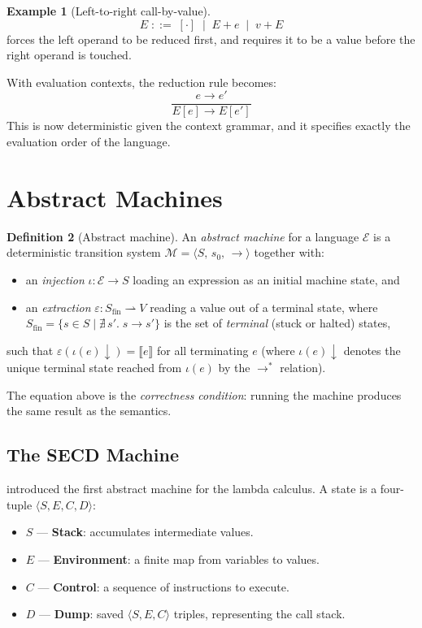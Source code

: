 \documentclass[11pt, a4paper]{article}
\theoremstyle{definition}
\newtheorem{definition}{Definition}[section]
\newtheorem{example}[definition]{Example}
\theoremstyle{plain}
\theoremstyle{remark}
\begin{document}
\begin{example}[Left-to-right call-by-value]
  \[
    E \;::=\; [\cdot] \;\mid\; E + e \;\mid\; v + E
  \]
  forces the left operand to be reduced first, and requires it to be a value
  before the right operand is touched.
\end{example}

With evaluation contexts, the reduction rule becomes:
\[
  \frac{e \to e'}{E[e] \to E[e']}
\]
This is now deterministic given the context grammar, and it specifies exactly
the evaluation order of the language.


\section{Abstract Machines}

\begin{definition}[Abstract machine]
  An \emph{abstract machine} for a language $\mathcal{E}$ is a deterministic
  transition system $\mathcal{M} = \langle S,\, s_0,\, \to\rangle$ together with:
  \begin{itemize}
    \item an \emph{injection} $\iota : \mathcal{E} \to S$ loading an
          expression as an initial machine state, and
    \item an \emph{extraction} $\varepsilon : S_{\mathrm{fin}} \rightharpoonup V$
          reading a value out of a terminal state, where
          $S_{\mathrm{fin}} = \{s \in S \mid \nexists\, s'.\; s \to s'\}$
          is the set of \emph{terminal} (stuck or halted) states,
  \end{itemize}
  such that $\varepsilon(\iota(e){\downarrow}) = \llbracket e \rrbracket$
  for all terminating $e$ (where $\iota(e){\downarrow}$ denotes the unique
  terminal state reached from $\iota(e)$ by the $\to^{*}$ relation).
\end{definition}

The equation above is the \emph{correctness condition}: running the machine
produces the same result as the semantics.

\subsection{The SECD Machine}

\citet{landin1964} introduced the first abstract machine for the lambda
calculus.  A state is a four-tuple $\langle S, E, C, D \rangle$:
\begin{itemize}
  \item $S$ --- \textbf{Stack}: accumulates intermediate values.
  \item $E$ --- \textbf{Environment}: a finite map from variables to values.
  \item $C$ --- \textbf{Control}: a sequence of instructions to execute.
  \item $D$ --- \textbf{Dump}: saved $\langle S, E, C \rangle$ triples,
        representing the call stack.
\end{itemize}
\end{document}
